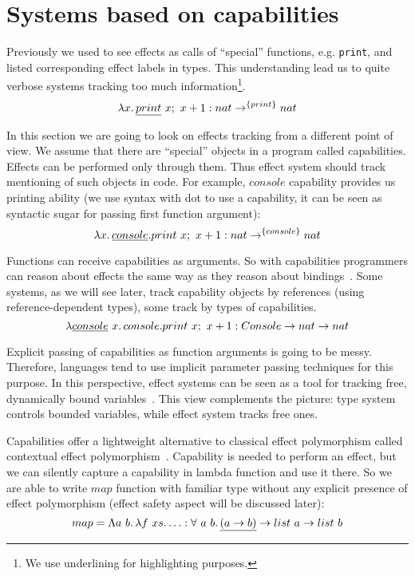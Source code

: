 \documentclass[conference]{IEEEtran}
\newcommand{\seq}{;~}
\newcommand{\ap}{~}
\begin{document}
    \section{Systems based on capabilities} \label{sec:capabilities}

    Previously we used to see effects as calls of ``special'' functions, e.g. \texttt{print}, and listed corresponding effect labels in types.
    This understanding lead us to quite verbose systems tracking too much information\footnote{We use underlining for highlighting purposes.}.
    \[\lambda x\ldotp \underline{print}\ap x\seq x + 1 : nat \to^{\{print\}} nat\]

    In this section we are going to look on effects tracking from a different point of view.
    We assume that there are ``special'' objects in a program called capabilities.
    Effects can be performed only through them.
    Thus effect system should track mentioning of such objects in code.
    For example, $console$ capability provides us printing ability (we use syntax with dot to use a capability, it can be seen as syntactic sugar for passing first function argument):
    \[\lambda x\ldotp \underline{console}.print\ap x\seq x + 1 : nat \to^{\{console\}} nat\]

    Functions can receive capabilities as arguments.
    So with capabilities programmers can reason about effects the same way as they reason about bindings~\cite{brachthauser2022effects}.
    Some systems, as we will see later, track capability objects by references (using reference-dependent types), some track by types of capabilities.
    \[\lambda \underline{console} \ap x \ldotp console.print\ap x\seq x + 1 : Console \to nat \to nat\]

    Explicit passing of capabilities as function arguments is going to be messy.
    Therefore, languages tend to use implicit parameter passing techniques for this purpose.
    In this perspective, effect systems can be seen as a tool for tracking free, dynamically bound variables~\cite{odersky2022scoped}.
    This view complements the picture: type system controls bounded variables, while effect system tracks free ones.

    Capabilities offer a lightweight alternative to classical effect polymorphism called contextual effect polymorphism~\cite{brachthauser2022effects}.
    Capability is needed to perform an effect, but we can silently capture a capability in lambda function and use it there.
    So we are able to write $map$ function with familiar type without any explicit presence of effect polymorphism (effect safety aspect will be discussed later):
    \[map = \Lambda a \ap b\ldotp \lambda f\ap xs\ldotp \ldots : \forall \ap a \ap b\ldotp \underline{(a \to b)} \to list \ap a \to list \ap b \]
\end{document}

